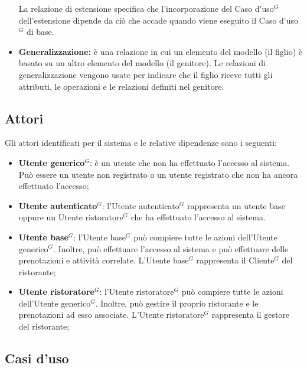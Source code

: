 \begin{itemize}
	La relazione di estensione specifica che l'incorporazione del \gls{Caso d'uso}$^G$ dell'estensione dipende da ciò che accade quando viene eseguito il \gls{Caso d'uso}$^G$ di base.
	\item \textbf{Generalizzazione:} è una relazione in cui un elemento del modello (il figlio) è basato su un altro elemento del modello (il genitore). 
		Le relazioni di generalizzazione vengono usate per indicare che il figlio riceve tutti gli attributi, le operazioni e le relazioni definiti nel genitore.
\end{itemize}

\subsection{Attori}

Gli attori identificati per il sistema e le relative dipendenze sono i seguenti:
\begin{itemize}
	\item \textbf{\gls{Utente generico}$^G$}: è un utente che non ha effettuato l'accesso al
	      sistema. Può essere un utente non registrato o un utente registrato che non ha
	      ancora effettuato l'accesso;

	\item \textbf{\gls{Utente autenticato}$^G$}: l'\gls{Utente autenticato}$^G$ rappresenta un utente
	      base oppure un \gls{Utente ristoratore}$^G$ che ha effettuato l'accesso al sistema.

	\item \textbf{\gls{Utente base}$^G$}: l'\gls{Utente base}$^G$ può compiere tutte le azioni
	      dell'\gls{Utente generico}$^G$. Inoltre, può effettuare l'accesso al sistema e può
	      effettuare delle prenotazioni e attività correlate. L'\gls{Utente base}$^G$ rappresenta
	      il \gls{Cliente}$^G$ del ristorante;

	\item \textbf{\gls{Utente ristoratore}$^G$}: l'\gls{Utente ristoratore}$^G$ può compiere tutte le
	      azioni dell'\gls{Utente generico}$^G$. Inoltre, può gestire il proprio ristorante e le
	      prenotazioni ad esso associate. L'\gls{Utente ristoratore}$^G$ rappresenta il gestore del
	      ristorante;
\end{itemize}

\subsection{Casi d'uso}
